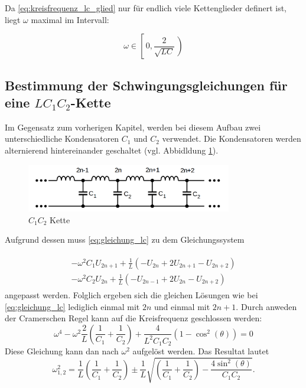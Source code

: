 Da \eqref{eq:kreisfrequenz_lc_glied} nur für endlich viele Kettenglieder definert ist, liegt $\omega$ maximal im Intervall:

\begin{equation}
\label{eq:menge_omega_lc_glied}
\omega\in\left[\,0,\frac{2}{\sqrt{LC}}\,\right)
\end{equation}

\subsection{Bestimmung der Schwingungsgleichungen für eine $LC_1C_2$-Kette}
Im Gegensatz zum vorherigen Kapitel, werden bei diesem Aufbau zwei unterschiedliche 
Kondensatoren $C_1$ und $C_2$ verwendet. Die Kondensatoren werden
alternierend hintereinander geschaltet (vgl. Abbidldung \ref{fig:alternierende_kette}).

\begin{figure}
  \centering
  \includegraphics[width=0.8\textwidth]{bilder/alternierende_kette.png}
  \caption{$C_1C_2$ Kette}
  \label{fig:alternierende_kette}
\end{figure}


Aufgrund dessen muss \eqref{eq:gleichung_lc} zu dem Gleichungssystem

\begin{align}
\label{eq:lc1c2_gleichungsy}
\begin{aligned}
-\omega^2C_1U_{2n+1}+\frac{1}{L}\left(-U_{2n}+2U_{2n+1}-U_{2n+2}\right)\\
-\omega^2C_2U_{2n}+\frac{1}{L}\left(-U_{2n-1}+2U_{2n}-U_{2n+2}\right)
\end{aligned}
\end{align}
angepasst werden.
Folglich ergeben sich die gleichen Lösungen wie bei \eqref{eq:gleichung_lc}
lediglich einmal mit $2n$ und einmal mit $2n+1$.
Durch anweden der Cramerschen Regel kann auf die Kreisfrequenz geschlossen werden:
\begin{equation*}
\omega^4-\omega^2\frac{2}{L}\left(\frac{1}{C_1}+\frac{1}{C_2}\right)+\frac{4}{L^2C_1C_2}\left(1-\cos^2(\theta)\right)=0
\end{equation*}
Diese Gleichung kann dan nach $\omega^2$ aufgelöst werden.
Das Resultat lautet
\begin{equation}
\label{eq:omgea_ceins_czwei}
\omega_{1,2}^{2}=\frac{1}{L}\left(\frac{1}{C_1}+\frac{1}{C_2}\right)\pm\frac{1}{L}\sqrt{\left(\frac{1}{C_1}+\frac{1}{C_2}\right)-\frac{4\sin^2(\theta)}{C_1C_2}}.
\end{equation}

